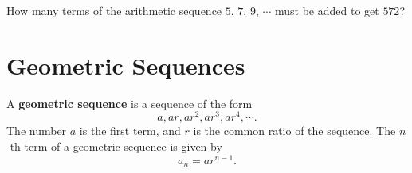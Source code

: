 \begin{example}
    How many terms of the arithmetic sequence $5$, $7$, $9$, $\cdots$ must be added to get $572$?
\end{example}
\vspace*{6\baselineskip}





\section{Geometric Sequences}

\begin{definition}
A \textbf{geometric sequence} is a sequence of the form
\[a, ar, ar^2, ar^3, ar^4, \cdots.\]
The number $a$ is the first term, and $r$ is the common ratio of the sequence.
The $n$-th term of a geometric sequence is given by
\[a_n=ar^{n-1}.\]
\end{definition}

